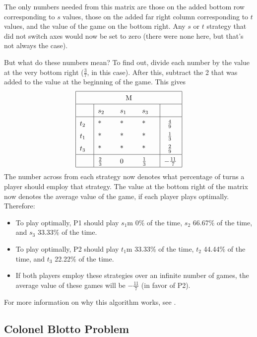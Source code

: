 \documentclass[11pt]{article}
\begin{document}
The only numbers needed from this matrix are those on the added bottom
row corresponding to
$s$ values, those on the added far right column corresponding to
$t$ values, and the value of the game on the bottom right. Any
$s$ or
$t$ strategy that did not switch axes would now be set to zero (there
were none here, but that's not always the case).

But what do these numbers mean? To find out, divide each number by the
value at the very bottom right ($\frac{3}{7}$, in this case). After
this, subtract the 2 that was added to the value at the beginning of
the game. This gives
\begin{equation*}
\renewcommand{\arraystretch}{1.5}
\begin{tabular}{ |p{0.5cm}|p{0.7cm} p{0.7cm} p{0.7cm}|p{0.7cm}| }
\hline
\multicolumn{5}{|c|}{M} \\
\hline
$\textcolor{white}{-}$ & $s_2$ & $s_1$ & $s_3$ & $\textcolor{white}{-}$\\
\hline
$t_2$ & * & * & * & \textcolor{white}{--}$\frac{4}{9}$\\
$t_1$ & * & * & * & \textcolor{white}{--}$\frac{1}{3}$\\
$t_3$ & * & * & * & \textcolor{white}{--}$\frac{2}{9}$\\
\hline
$\textcolor{white}{-}$ & $\frac{2}{3}$ & 0 & $\frac{1}{3}$ & $-\frac{11}{7}$\\
\hline
\end{tabular}
\end{equation*}
The number across from each strategy now denotes what percentage of
turns a player should employ that strategy. The value at the bottom
right of the matrix now denotes the average value of the game, if each
player plays optimally. Therefore:
\begin{itemize}
\item To play optimally, P1 should play $s_1$m 0\% of the time, $s_2$
66.67\% of the time, and $s_3$ 33.33\% of the time.
\item To play optimally, P2 should play $t_1$m 33.33\% of the time,
$t_2$ 44.44\% of the time, and $t_3$ 22.22\% of the time.
\item If both players employ these strategies over an infinite number
of games, the average value of these games will be $-\frac{11}{7}$
(in favor of P2).
\end{itemize}
For more information on why this algorithm works, see
\cite{gametheory}.

\subsection{Colonel Blotto Problem}
\end{document}
